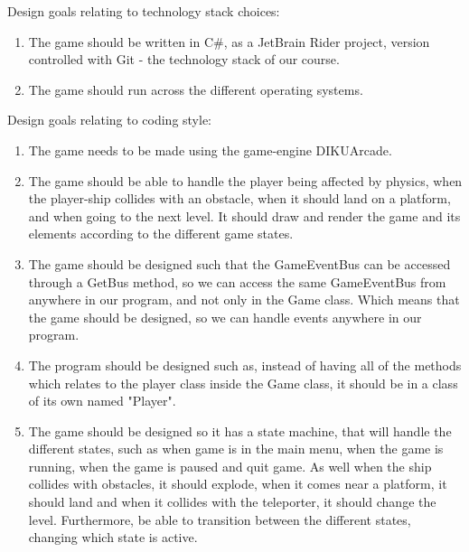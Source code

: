 \documentclass[../master.tex]{subfile}
\begin{document}
Design goals relating to technology stack choices:
\begin{enumerate}
	\item The game should be written in C\#, as a JetBrain Rider project, version controlled with Git - the technology stack of our course.
	\item The game should run across the different operating systems. 
\end{enumerate}

Design goals relating to coding style:
\begin{enumerate}
	\item The game needs to be made using the game-engine DIKUArcade.
	\item The game should be able to handle the player being affected by physics, when the player-ship collides with an obstacle, when it should land on a platform, and when going to the next level. It should draw and render the game and its elements according to the different game states. 
	\item The game should be designed such that the GameEventBus can be accessed through a GetBus method, so we can access the same GameEventBus from anywhere in our program, and not only in the Game class. Which means that the game should be designed, so we can handle events anywhere in our program.
	\item The program should be designed such as, instead of having all of the methods which relates to the player class inside the Game class, it should be in a class of its own named "Player".
	\item The game should be designed so it has a state machine, that will handle the different states, such as when game is in the main menu, when the game is running, when the game is paused and quit game. As well when the ship collides with obstacles, it should explode, when it comes near a platform, it should land and when it collides with the teleporter, it should change the level. Furthermore, be able to transition between the different states, changing which state is active.
\end{enumerate}
\end{document}
